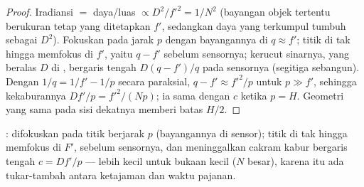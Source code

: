\begin{proof}
Iradiansi $=$ daya/luas $\propto D^2/f'^2 = 1/N^2$ (bayangan objek
tertentu berukuran tetap yang ditetapkan $f'$, sedangkan daya yang
terkumpul tumbuh sebagai $D^2$). Fokuskan pada jarak $p$ dengan
bayangannya di $q \approx f'$; titik di tak hingga memfokus di $f'$,
yaitu $q - f'$ sebelum sensornya; kerucut sinarnya, yang beralas $D$ di
, bergaris tengah $D(q - f')/q$ pada sensornya (segitiga
sebangun). Dengan $1/q = 1/f' - 1/p$ secara paraksial,
$q - f' \approx f'^2/p$ untuk $p \gg f'$, sehingga kekaburannya
$Df'/p = f'^2/(Np)$; ia sama dengan $c$ ketika $p = H$. Geometri yang
sama pada sisi dekatnya memberi batas $H/2$.
\end{proof}

\begin{omfigure}

{\small {}:  difokuskan pada titik berjarak $p$
(bayangannya di sensor); titik di tak hingga memfokus di $F'$, sebelum
sensornya, dan meninggalkan cakram kabur bergaris tengah $c = Df'/p$ ---
lebih kecil untuk bukaan kecil ($N$ besar), karena itu ada tukar-tambah
antara ketajaman dan waktu pajanan.}
\end{omfigure}


